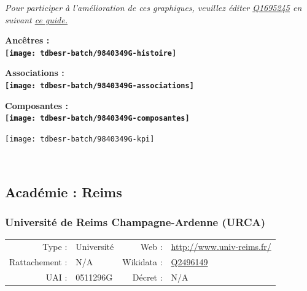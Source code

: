 \documentclass[12pt,french,]{article}
\begin{document}
\textit{\scriptsize Pour participer à l'amélioration de ces graphiques, veuillez éditer  \href{https://www.wikidata.org/entity/Q1695245}{Q1695245}  en suivant \href{https://github.com/cpesr/wikidataESR/blob/master/Rmd/wikidataESR.md}{ce guide.}}

\vspace{1cm}  
\begin{minipage}[b]{0.50\textwidth}\begin{center} \bf Ancêtres : \\  
\texttt{[image: tdbesr-batch/9840349G-histoire]} \end{center}\end{minipage}\begin{minipage}[b]{0.50\textwidth}\begin{center} \bf Associations : \\  
\texttt{[image: tdbesr-batch/9840349G-associations]} \end{center}\end{minipage}

\hrulefill

\begin{center} \bf Composantes : \\  
\texttt{[image: tdbesr-batch/9840349G-composantes]} \end{center}

\begin{center}\texttt{[image: tdbesr-batch/9840349G-kpi]} \end{center}\checkoddpage

\ifoddpage ~\newpage \fi   

\hypertarget{acaduxe9mie-reims}{%
\subsection{Académie : Reims}\label{acaduxe9mie-reims}}

\hypertarget{universituxe9-de-reims-champagne-ardenne-urca}{%
\subsubsection{Université de Reims Champagne-Ardenne
(URCA)}\label{universituxe9-de-reims-champagne-ardenne-urca}}

\begin{tabular*}{\textwidth}{rp{5cm}rl}  
\hline  
Type : & Université & Web : &\href{http://www.univ-reims.fr/}{http://www.univ-reims.fr/} \\  
Rattachement : & N/A & Wikidata : & \href{https://www.wikidata.org/entity/Q2496149}{Q2496149} \\  
UAI : & 0511296G & Décret : & N/A \\  
\hline  
\end{tabular*}
\end{document}
